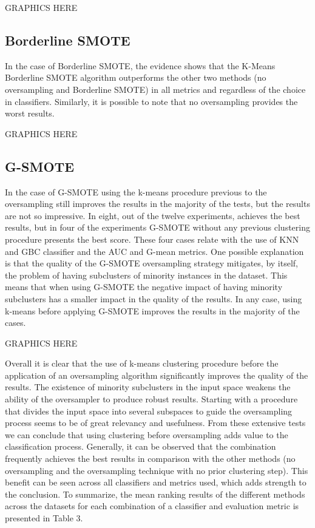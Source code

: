 \documentclass[parskip=full]{scrartcl}
\begin{document}
GRAPHICS HERE

\subsection{Borderline SMOTE}

In the case of Borderline SMOTE, the evidence shows that the K-Means Borderline 
SMOTE algorithm outperforms the other two methods (no oversampling and 
Borderline SMOTE) in all metrics and regardless of the choice in classifiers. 
Similarly, it is possible to note that no oversampling provides the worst 
results.

GRAPHICS HERE

\subsection{G-SMOTE}

In the case of G-SMOTE using the k-means procedure previous to the oversampling 
still improves the results in the majority of the tests, but the results are 
not so impressive. In eight, out of the twelve experiments, achieves the best 
results, but in four of the experiments G-SMOTE without any previous clustering 
procedure presents the best score. These four cases relate with the use of KNN 
and GBC classifier and the AUC and G-mean metrics. One possible explanation is 
that the quality of the G-SMOTE oversampling strategy mitigates, by itself, the 
problem of having subclusters of minority instances in the dataset. This means 
that when using G-SMOTE the negative impact of having minority subclusters has 
a smaller impact in the quality of the results. In any case, using k-means 
before applying G-SMOTE improves the results in the majority of the cases.

GRAPHICS HERE

Overall it is clear that the use of k-means clustering procedure before the 
application of an oversampling algorithm significantly improves the quality of 
the results. The existence of minority subclusters in the input space weakens 
the ability of the oversampler to produce robust results. Starting with a 
procedure that divides the input space into several subspaces to guide the 
oversampling process seems to be of great relevancy and usefulness. From these 
extensive tests we can conclude that using clustering before oversampling adds 
value to the classification process. Generally, it can be observed that the 
combination frequently achieves the best results in comparison with the other 
methods (no oversampling and the oversampling technique with no prior 
clustering step). This benefit can be seen across all classifiers and metrics 
used, which adds strength to the conclusion. To summarize, the mean ranking 
results of the different methods across the datasets for each combination of a 
classifier and evaluation metric is presented in Table 3.



\end{document}
